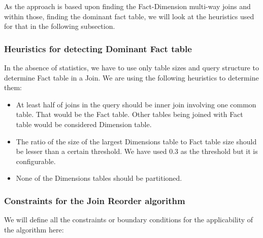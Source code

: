 As the approach is based upon finding the Fact-Dimension multi-way joins and within those, finding the dominant fact table, we will look at the heuristics used for that in the following subsection.

\subsubsection{Heuristics for detecting Dominant Fact table}
In the absence of statistics, we have to use only table sizes and query structure to determine Fact table in a Join. We are using the following heuristics to determine them:

\begin{itemize}
\item At least half of joins in the query should be inner join involving one common table. That would be the Fact table. Other tables being joined with Fact table would be considered Dimension table.
\item The ratio of the size of the largest Dimensions table to Fact table size should be lesser than a certain threshold. We have used 0.3 as the threshold but it is configurable.
\item None of the Dimensions tables should be partitioned.
\end{itemize}

\subsubsection{Constraints for the Join Reorder algorithm}
We will define all the constraints or boundary conditions for the applicability of the algorithm here:


